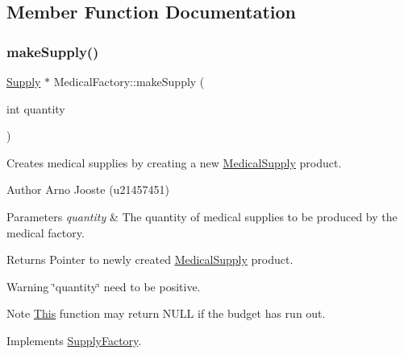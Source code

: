 \subsection{Member Function Documentation}
\mbox{\label{class_medical_factory_a323b36eb230b6b4e261dd2fed1164d5c}} 
\subsubsection{\texorpdfstring{makeSupply()}{makeSupply()}}
{\footnotesize\ttfamily \mbox{\hyperlink{class_supply}{Supply}} $\ast$ Medical\+Factory\+::make\+Supply (\begin{DoxyParamCaption}\item[{int}]{quantity }\end{DoxyParamCaption})\hspace{0.3cm}{\ttfamily [virtual]}}



Creates medical supplies by creating a new \mbox{\hyperlink{class_medical_supply}{Medical\+Supply}} product. 

\begin{DoxyAuthor}{Author}
Arno Jooste (u21457451) 
\end{DoxyAuthor}

\begin{DoxyParams}{Parameters}
{\em quantity} & The quantity of medical supplies to be produced by the medical factory. \\
\hline
\end{DoxyParams}
\begin{DoxyReturn}{Returns}
Pointer to newly created \mbox{\hyperlink{class_medical_supply}{Medical\+Supply}} product. 
\end{DoxyReturn}
\begin{DoxyWarning}{Warning}
\char`\"{}quantity\char`\"{} need to be positive. 
\end{DoxyWarning}
\begin{DoxyNote}{Note}
\mbox{\hyperlink{class_this}{This}} function may return N\+U\+LL if the budget has run out. 
\end{DoxyNote}


Implements \mbox{\hyperlink{class_supply_factory_a110ff7418c656661e935a33e49300722}{Supply\+Factory}}.

